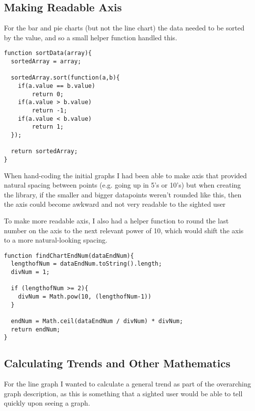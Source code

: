 \documentclass[ %
                    author={Aleena Baig},
                supervisor={Dr Simon Lock},
                    degree={BSc},
                     title={On Making Web Accessible Graphs},
                  subtitle={},
                      year={2019} ]{dissertation}
\begin{document}

\subsection{Making Readable Axis}

For the bar and pie charts (but not the line chart) the data needed to be sorted by the value, and so a small helper function handled this.

\begin{lstlisting}
function sortData(array){
  sortedArray = array;

  sortedArray.sort(function(a,b){
    if(a.value == b.value)
        return 0;
    if(a.value > b.value)
        return -1;
    if(a.value < b.value)
        return 1;
  });

  return sortedArray;
}
\end{lstlisting}

When hand-coding the initial graphs I had been able to make axis that provided natural spacing between points (e.g. going up in 5's or 10's) but when creating the library, if the smaller and bigger datapoints weren't rounded like this, then the axis could become awkward and not very readable to the sighted user


To make more readable axis, I also had a helper function to round the last number on the axis to the next relevant power of 10, which would shift the axis to a more natural-looking spacing.

\begin{lstlisting}
function findChartEndNum(dataEndNum){
  lengthofNum = dataEndNum.toString().length;
  divNum = 1;

  if (lengthofNum >= 2){
    divNum = Math.pow(10, (lengthofNum-1))
  }

  endNum = Math.ceil(dataEndNum / divNum) * divNum;
  return endNum;
}
\end{lstlisting}


\subsection{Calculating Trends and Other Mathematics}

For the line graph I wanted to calculate a general trend as part of the overarching graph description, as this is something that a sighted user would be able to tell quickly upon seeing a graph.
\end{document}
